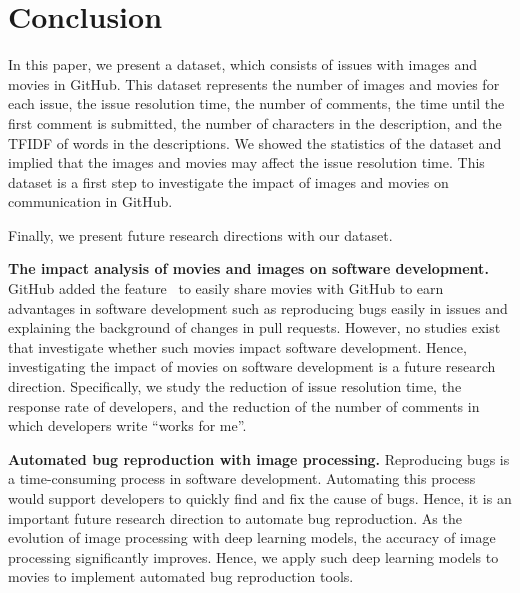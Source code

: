 \section{Conclusion}
\label{sec:conclusion}

In this paper, we present a dataset, 
which consists of issues with images and movies 
in GitHub. 
This dataset represents the number of images and movies 
for each issue, 
the issue resolution time, 
the number of comments, 
the time until the first comment is submitted, 
the number of characters in the description, 
and the TFIDF of words in the descriptions. 
We showed the statistics of the dataset and 
implied that the images and movies may affect 
the issue resolution time. 
This dataset is a first step to investigate 
the impact of images and movies on communication in GitHub. 

Finally, we present future research directions with our dataset. 


\noindent
\textbf{The impact analysis of movies and images on software development.}
GitHub added the feature~\citep{github-video-blog} to easily 
share movies with GitHub to earn advantages 
in software development such as reproducing bugs easily in issues and 
explaining the background of changes in pull requests. 
However, no studies exist that investigate whether such movies 
impact software development. 
Hence, investigating the impact of movies on software development 
is a future research direction. 
Specifically, we study the reduction of issue resolution time, 
the response rate of developers, and 
the reduction of the number of comments 
in which developers write ``works for me''. 

\noindent
\textbf{Automated bug reproduction with image processing.}
Reproducing bugs is a time-consuming process 
in software development.
Automating this process would support developers 
to quickly find and fix the cause of bugs. 
Hence, it is an important future research direction 
to automate bug reproduction. 
As the evolution of image processing with deep learning models, 
the accuracy of image processing significantly improves. 
Hence, we apply such deep learning models to movies 
to implement automated bug reproduction tools. 